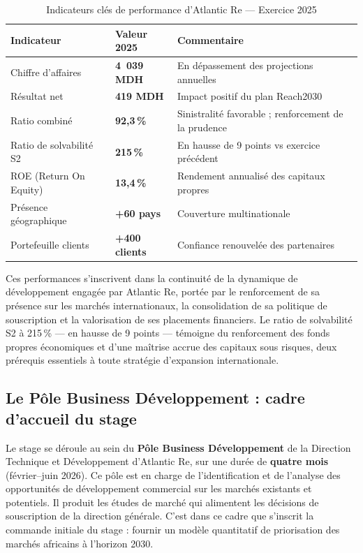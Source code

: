\documentclass[12pt,a4paper]{report}
\begin{document}
\begin{table}[H]
\centering
\caption{Indicateurs clés de performance d'Atlantic Re --- Exercice 2025}
\label{tab:kpi_atlanticre}
\small
\begin{tabularx}{\textwidth}{@{}p{5cm}p{3cm}X@{}}
\toprule
\textbf{Indicateur} & \textbf{Valeur 2025} & \textbf{Commentaire} \\
\midrule
Chiffre d'affaires            & \textbf{4~039 MDH}  & En dépassement des projections annuelles \\
Résultat net                  & \textbf{419 MDH}    & Impact positif du plan Reach2030 \\
Ratio combiné                 & \textbf{92,3\,\%}   & Sinistralité favorable ; renforcement de la prudence \\
Ratio de solvabilité S2       & \textbf{215\,\%}    & En hausse de 9 points vs exercice précédent \\
ROE (Return On Equity)        & \textbf{13,4\,\%}   & Rendement annualisé des capitaux propres \\
Présence géographique         & \textbf{+60 pays}   & Couverture multinationale \\
Portefeuille clients          & \textbf{+400 clients} & Confiance renouvelée des partenaires \\
\bottomrule
\end{tabularx}
\end{table}

Ces performances s'inscrivent dans la continuité de la dynamique de développement
engagée par Atlantic Re, portée par le renforcement de sa présence sur les marchés
internationaux, la consolidation de sa politique de souscription et la valorisation
de ses placements financiers. Le ratio de solvabilité S2 à 215\,\% --- en hausse de
9 points --- témoigne du renforcement des fonds propres économiques et d'une maîtrise
accrue des capitaux sous risques, deux prérequis essentiels à toute stratégie
d'expansion internationale.



\subsection{Le Pôle Business Développement : cadre d'accueil du stage}

Le stage se déroule au sein du \textbf{Pôle Business Développement} de la Direction
Technique et Développement d'Atlantic Re, sur une durée de \textbf{quatre mois}
(février--juin 2026). Ce pôle est en charge de l'identification et de l'analyse des
opportunités de développement commercial sur les marchés existants et potentiels. Il
produit les études de marché qui alimentent les décisions de souscription de la
direction générale. C'est dans ce cadre que s'inscrit la commande initiale du stage :
fournir un modèle quantitatif de priorisation des marchés africains à l'horizon 2030.
\end{document}
